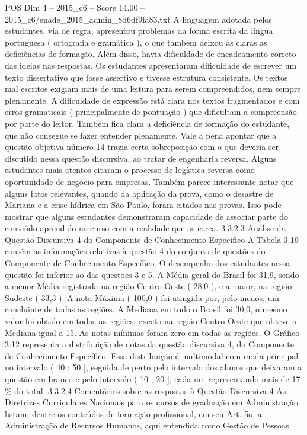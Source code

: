 \begin{textsample}{POS Dim 4 – 2015\_c6 – Score 14.00 – 2015\_c6/enade\_2015\_admin\_8d6df9fa83.txt}
A linguagem adotada pelos estudantes, via de regra, apresentou problemas da forma escrita da língua portuguesa ( ortografia e gramática ), o que também deixou às claras as deficiências de formação.
Além disso, havia dificuldade de encadeamento correto das ideias nas respostas.
Os estudantes apresentaram dificuldade de escrever um texto dissertativo que fosse assertivo e tivesse estrutura consistente.
Os textos mal escritos exigiam mais de uma leitura para serem compreendidos, nem sempre plenamente.
A dificuldade de expressão está clara nos textos fragmentados e com erros gramaticais ( principalmente de pontuação ) que dificultam a compreensão por parte do leitor.
Também fica clara a deficiência de formação do estudante, que não consegue se fazer entender plenamente.
Vale a pena apontar que a questão objetiva número 14 trazia certa sobreposição com o que deveria ser discutido nessa questão discursiva, ao tratar de engenharia reversa.
Alguns estudantes mais atentos citaram o processo de logística reversa como oportunidade de negócio para empresas.
Também parece interessante notar que alguns fatos relevantes, quando da aplicação da prova, como o desastre de Mariana e a crise hídrica em São Paulo, foram citados nas provas.
Isso pode mostrar que alguns estudantes demonstraram capacidade de associar parte do conteúdo aprendido no curso com a realidade que os cerca. 3.3.2.3 Análise da Questão Discursiva 4 do Componente de Conhecimento Específico A Tabela 3.19 contém as informações relativas à questão 4 do conjunto de questões do Componente de Conhecimento Específico.
O desempenho dos estudantes nessa questão foi inferior ao das questões 3 e 5.
A Média geral do Brasil foi 31,9, sendo a menor Média registrada na região Centro-Oeste ( 28,0 ), e a maior, na região Sudeste ( 33,3 ).
A nota Máxima ( 100,0 ) foi atingida por, pelo menos, um concluinte de todas as regiões.
A Mediana em todo o Brasil foi 30,0, o mesmo valor foi obtido em todas as regiões, exceto na região Centro-Oeste que obteve a Mediana igual a 15.
As notas mínimas foram zero em todas as regiões.
O Gráfico 3.12 representa a distribuição de notas da questão discursiva 4, do Componente de Conhecimento Específico.
Essa distribuição é multimodal com moda principal no intervalo ( 40 ; 50 ], seguida de perto pelo intervalo dos alunos que deixaram a questão em branco e pelo intervalo ( 10 ; 20 ], cada um representando mais de 17 \% do total. 3.3.2.4 Comentários sobre as respostas à Questão Discursiva 4 As Diretrizes Curriculares Nacionais para os cursos de graduação em Administração listam, dentre os conteúdos de formação profissional, em seu Art. 5o, a Administração de Recursos Humanos, aqui entendida como Gestão de Pessoas.

\end{textsample}
